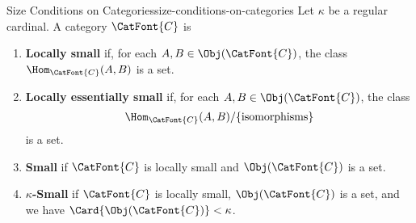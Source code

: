 \begin{definition}{Size Conditions on Categories}{size-conditions-on-categories}%
    Let $\kappa$ be a regular cardinal. A category $\CatFont{C}$ is
    \begin{enumerate}
        \item\label{size-conditions-on-categories-a}\textbf{Locally small} if, for each $A,B\in\Obj(\CatFont{C})$, the class $\Hom_{\CatFont{C}}(A,B)$ is a set.
        \item\label{size-conditions-on-categories-b}\textbf{Locally essentially small} if, for each $A,B\in\Obj(\CatFont{C})$, the class
            \[%
                \Hom_{\CatFont{C}}(A,B)/\{\text{isomorphisms}\}%
            \]%
            is a set.
        \item\label{size-conditions-on-categories-c}\textbf{Small} if $\CatFont{C}$ is locally small and $\Obj(\CatFont{C})$ is a set.
        \item\label{size-conditions-on-categories-d}\textbf{$\kappa$-Small} if $\CatFont{C}$ is locally small, $\Obj(\CatFont{C})$ is a set, and we have $\Card{\Obj(\CatFont{C})}<\kappa$.%
    \end{enumerate}
\end{definition}
